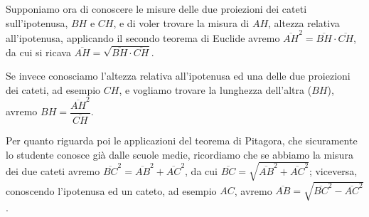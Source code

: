 Supponiamo ora di conoscere le misure delle due proiezioni dei cateti sull'ipotenusa, $BH$ e $CH$, e di voler trovare la misura di $AH$, altezza relativa all'ipotenusa, applicando il secondo teorema di Euclide avremo $\overline{AH}^2=\overline{BH}\cdot \overline{CH}$, da cui si ricava $\overline{AH}=\sqrt{\overline{BH}\cdot\overline{CH}}$.

Se invece conosciamo l'altezza relativa all'ipotenusa ed una delle due proiezioni dei cateti, ad esempio $CH$, e vogliamo trovare la lunghezza dell'altra ($BH$), avremo $BH=\dfrac{\overline{AH}^2}{\overline{CH}}$.

Per quanto riguarda poi le applicazioni del teorema di Pitagora, che sicuramente lo studente conosce già dalle scuole medie, ricordiamo che se abbiamo la misura dei due cateti avremo $\overline{BC}^2=\overline{AB}^2+\overline{AC}^2$, da cui $\overline{BC}=\sqrt{\overline{AB}^2+\overline{AC}^2}$; viceversa, conoscendo l'ipotenusa ed un cateto, ad esempio $AC$, avremo $\overline{AB}=\sqrt{\overline{BC}^2-\overline{AC}^2}$.

